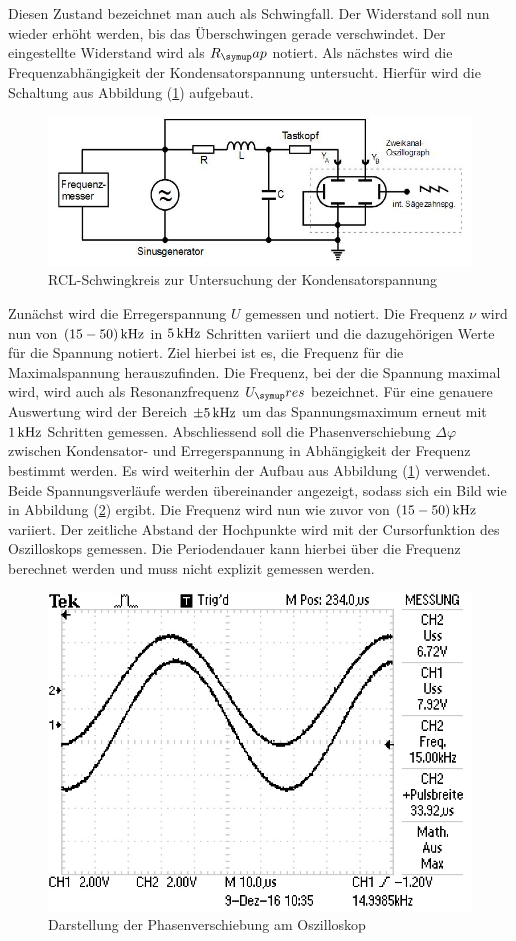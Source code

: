 Diesen Zustand bezeichnet man auch als Schwingfall. Der Widerstand soll nun
wieder erhöht werden, bis das Überschwingen gerade verschwindet. Der eingestellte
Widerstand wird als $R_\su{ap}$ notiert.
\newpage
Als nächstes wird die Frequenzabhängigkeit der Kondensatorspannung untersucht.
Hierfür wird die Schaltung aus Abbildung (\ref{fig:phaseschlt}) aufgebaut.
\begin{figure}[h]
  \centering
  \includegraphics[width=\textwidth]{Bilder/Phaseschalt.JPG}
  \caption{RCL-Schwingkreis zur Untersuchung der Kondensatorspannung\cite{354}}
  \label{fig:phaseschlt}
\end{figure}
Zunächst wird die Erregerspannung $U$ gemessen und notiert. Die Frequenz $\nu$
wird nun von $(15-50)\,\si{\kilo\hertz}$ in $5\,\si{\kilo\hertz}$ Schritten variiert und die dazugehörigen
Werte für die Spannung notiert. Ziel hierbei ist es, die Frequenz für die
Maximalspannung herauszufinden. Die Frequenz, bei der die Spannung maximal wird,
wird auch als Resonanzfrequenz $U_\su{res}$ bezeichnet. Für eine genauere
Auswertung wird der Bereich $\pm 5\,\si{\kilo\hertz}$ um das Spannungsmaximum erneut mit $1\,\si{\kilo\hertz}$
Schritten gemessen.
Abschliessend soll die Phasenverschiebung $\Delta\varphi$ zwischen
Kondensator- und Erregerspannung in Abhängigkeit der Frequenz
bestimmt werden. Es wird weiterhin der Aufbau aus Abbildung
(\ref{fig:phaseschlt}) verwendet. Beide Spannungsverläufe werden übereinander
angezeigt, sodass sich ein Bild wie in Abbildung (\ref{fig:dphi}) ergibt. Die
Frequenz wird nun wie zuvor von $(15-50)\,\si{\kilo\hertz}$ variiert. Der zeitliche Abstand
der Hochpunkte wird mit der Cursorfunktion des Oszilloskops gemessen. Die
Periodendauer kann hierbei über die Frequenz berechnet werden und muss nicht
explizit gemessen werden.
\begin{figure}
  \centering
  \includegraphics[angle=90]{Bilder/dphi.JPG}
  \caption{Darstellung der Phasenverschiebung am Oszilloskop}
  \label{fig:dphi}
\end{figure}

